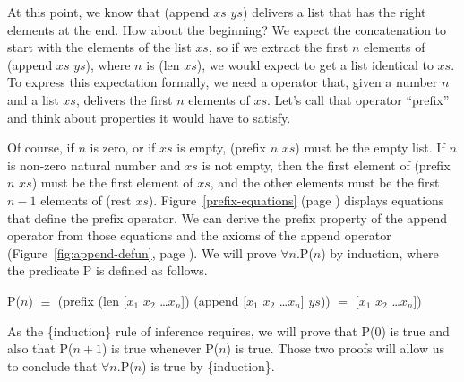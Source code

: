 At this point, we know that (append $xs$ $ys$) delivers
a list that has the right elements at the end.
How about the beginning?
We expect the concatenation to start with the elements of the list $xs$,
so if we extract the first $n$ elements of (append $xs$ $ys$), where $n$ is (len $xs$),
we would expect to get a list identical to $xs$.
To express this expectation formally, we need a operator that,
given a number $n$ and a list $xs$, delivers the first $n$ elements of $xs$.
Let's call that operator ``prefix'' and think about properties it would have to satisfy.

Of course, if $n$ is zero, or if $xs$ is empty,
(prefix $n$ $xs$) must be the empty list.
If $n$ is non-zero natural number and $xs$ is not empty,
then the first element of (prefix $n$ $xs$) must be the first element of $xs$,
and the other elements must be the first $n-1$ elements of (rest $xs$).
Figure~\ref{prefix-equations} (page \pageref{prefix-equations}) displays
equations that define the prefix operator.
We can derive the prefix property of the append operator
from those equations and the axioms of the append operator
(Figure~\ref{fig:append-defun}, page \pageref{fig:append-defun}).
We will prove $\forall n.$P($n$) by induction,
where the predicate P is defined as follows.

\begin{samepage}
\begin{center}
P($n$) $\equiv$ (prefix (len [$x_1$ $x_2$ \dots $x_n$]) (append [$x_1$ $x_2$ \dots $x_n$] $ys$))
                $=$ [$x_1$ $x_2$ \dots $x_n$])
\end{center}
\end{samepage}

As the \{induction\} rule of inference requires, we will prove that P(0) is true
and also that P($n+1$) is true whenever P($n$) is true.
Those two proofs will allow us to conclude that
$\forall n.$P($n$) is true by \{induction\}.


